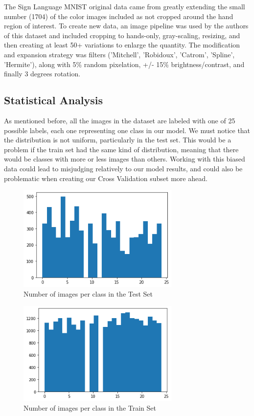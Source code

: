 \documentclass[conference]{IEEEtran}
\begin{document}
The Sign Language MNIST original data came from greatly extending the small number (1704) of the color images included as not cropped around the hand region of interest.\cite{kaggle} To create new data, an image pipeline was used by the authors of this dataset\cite{kaggle} and included cropping to hands-only, gray-scaling, resizing, and then creating at least 50+ variations to enlarge the quantity. The modification and expansion strategy was filters ('Mitchell', 'Robidoux', 'Catrom', 'Spline', 'Hermite'), along with 5\% random pixelation, +/- 15\% brightness/contrast, and finally 3 degrees rotation.

\subsection{Statistical Analysis}

As mentioned before, all the images in the dataset are labeled with one of 25 possible labels, each one representing one class in our model. We must notice that the distribution is not uniform, particularly in the test set. This would be a problem if the train set had the same kind of distribution, meaning that there would be classes with more or less images than others. Working with this biased data could lead to misjudging relatively to our model results, and could also be problematic when creating our Cross Validation subset more ahead.

\begin{figure}[htbp]
    \centerline{\includegraphics[width=8cm]{img/test_classes_hist.png}}
    \caption{Number of images per class in the Test Set}
    \label{fig:hist_test_classes}
\end{figure}
\begin{figure}[htbp]
    \centerline{\includegraphics[width=8cm]{img/train_classes_hist.png}}
    \caption{Number of images per class in the Train Set}
    \label{fig:hist_train_classes}
\end{figure}
\end{document}
